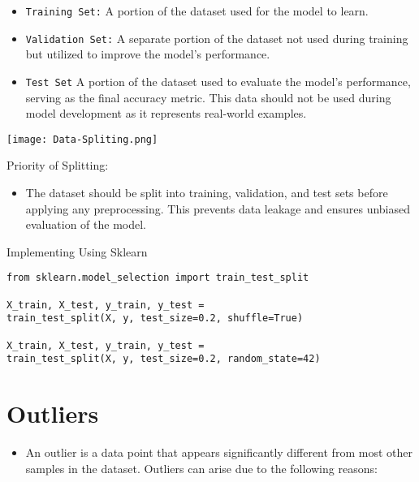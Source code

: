 \documentclass[serif, aspectratio=169]{beamer}
\begin{document}
\begin{frame}
    \begin{itemize}
        \item \texttt{\color{red}Training Set:} A portion of the dataset used for the model to learn.
        \item \texttt{\color{red}Validation Set:} A separate portion of the dataset not used during training but utilized to improve the model's performance.
        \item \texttt{\color{red}Test Set} A portion of the dataset used to evaluate the model's performance, serving as the final accuracy metric. This data should not be used during model development as it represents real-world examples.
    \end{itemize}
\end{frame}

\begin{frame}
    \centering
    \texttt{[image: Data-Spliting.png]}
\end{frame}

\begin{frame}{Priority of Splitting:}
    \begin{itemize}
        \item The dataset should be split into training, validation, and test sets before applying any preprocessing. This prevents data leakage and ensures unbiased evaluation of the model.
    \end{itemize}
\end{frame}

\begin{frame}[fragile]{Implementing Using Sklearn}
	\begin{lstlisting}
from sklearn.model_selection import train_test_split

X_train, X_test, y_train, y_test = 
train_test_split(X, y, test_size=0.2, shuffle=True)

X_train, X_test, y_train, y_test = 
train_test_split(X, y, test_size=0.2, random_state=42)
       \end{lstlisting}
\end{frame}

\section{Outliers}
\begin{frame}
    \begin{itemize}
        \item An outlier is a data point that appears significantly different from most other samples in the dataset. Outliers can arise due to the following reasons:
    \end{itemize}
\end{frame}
\end{document}
